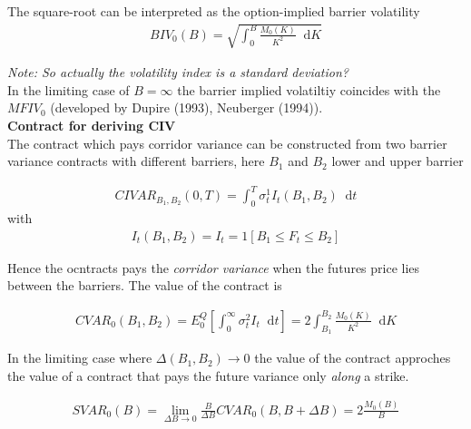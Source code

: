 \documentclass{article}
\newcommand*\diff{\mathop{}\!\mathrm{d}}
\begin{document}
The square-root can be interpreted as the option-implied barrier volatility
\begin{align*}
BIV_{0}(B) = \sqrt{\int_{0}^{B} \frac{M_{0}(K)}{K^{2}} \diff K}
\end{align*}

\textit{Note: So actually the volatility index is a standard deviation?}\\

In the limiting case of $B = \infty$ the barrier implied volatiltiy coincides with the $MFIV_{0}$ (developed by Dupire (1993), Neuberger (1994)).\\

\textbf{Contract for deriving CIV}\\

The contract which pays corridor variance can be constructed from two barrier variance contracts with different barriers, here $B_{1}$ and $B_{2}$ lower and upper barrier

\begin{align*}
CIV AR_{B_{1}, B_{2}}(0,T) = \int_{0}^{T} \sigma_{t}^{1}I_{t}(B_{1}, B_{2}) \diff t
\end{align*}
with 
\begin{align*}
I_{t}(B_{1}, B_{2}) = I_{t} = 1[B_{1} \leq F_{t} \leq B_{2}]
\end{align*}

Hence the ocntracts pays the \textit{corridor variance} when the futures price lies between the barriers. The value of the contract is

\begin{align*}
CV AR_{0}(B_{1}, B_{2}) = E_{0}^{Q} \left[ \int_{0}^{\infty} \sigma_{t}^{2} I_{t} \diff t \right] = 2 \int_{B_{1}}^{B_{2}} \frac{M_{0}(K)}{K^{2}} \diff K
\end{align*}

In the limiting case where $\Delta (B_{1}, B_{2}) \rightarrow 0$ the value of the contract approches the value of a contract that pays the future variance only \textit{along} a strike. 

\begin{align*}
SV AR_{0}(B) = \lim_{\Delta B \rightarrow 0} \frac{B}{\Delta B} CV AR_{0}(B, B + \Delta B) = 2 \frac{M_{0}(B)}{B}
\end{align*}
\end{document}
